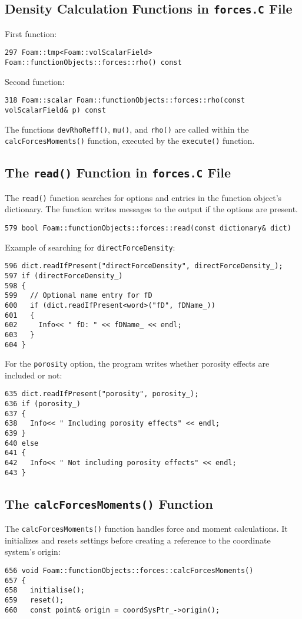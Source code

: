 \subsection*{Density Calculation Functions in \texttt{forces.C} File}
First function:
\begin{lstlisting}
297 Foam::tmp<Foam::volScalarField> Foam::functionObjects::forces::rho() const
\end{lstlisting}
Second function:
\begin{lstlisting}
318 Foam::scalar Foam::functionObjects::forces::rho(const volScalarField& p) const
\end{lstlisting}

\noindent The functions \texttt{devRhoReff()}, \texttt{mu()}, and \texttt{rho()} are called within the \texttt{calcForcesMoments()} function, executed by the \texttt{execute()} function.

\subsection*{The \texttt{read()} Function in \texttt{forces.C} File}
The \texttt{read()} function searches for options and entries in the function object's dictionary. The function writes messages to the output if the options are present.

\begin{lstlisting}
579 bool Foam::functionObjects::forces::read(const dictionary& dict)
\end{lstlisting}

Example of searching for \texttt{directForceDensity}:
\begin{lstlisting}
596 dict.readIfPresent("directForceDensity", directForceDensity_);
597 if (directForceDensity_)
598 {
599   // Optional name entry for fD
600   if (dict.readIfPresent<word>("fD", fDName_))
601   {
602     Info<< " fD: " << fDName_ << endl;
603   }
604 }
\end{lstlisting}

For the \texttt{porosity} option, the program writes whether porosity effects are included or not:
\begin{lstlisting}
635 dict.readIfPresent("porosity", porosity_);
636 if (porosity_)
637 {
638   Info<< " Including porosity effects" << endl;
639 }
640 else
641 {
642   Info<< " Not including porosity effects" << endl;
643 }
\end{lstlisting}

\subsection*{The \texttt{calcForcesMoments()} Function}
The \texttt{calcForcesMoments()} function handles force and moment calculations. It initializes and resets settings before creating a reference to the coordinate system's origin:
\begin{lstlisting}
656 void Foam::functionObjects::forces::calcForcesMoments()
657 {
658   initialise();
659   reset();
660   const point& origin = coordSysPtr_->origin();
\end{lstlisting}

